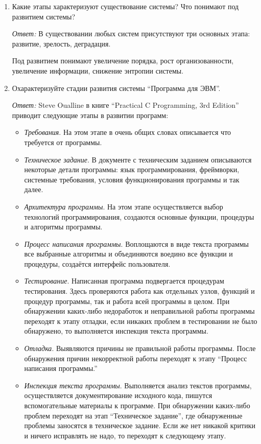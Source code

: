 \documentclass[10pt]{article}
\begin{document}
\begin{enumerate}
\item{Какие этапы характеризуют существование системы? Что понимают под развитием системы?}

  \emph{Ответ:} В существовании любых систем присутствуют три основных этапа: развитие, зрелость, деградация.

  Под развитием понимают увеличение порядка, рост организованности, увеличение информации, снижение энтропии системы.

\item{Охарактеризуйте стадии развития системы ``Программа для ЭВМ''.}

  \emph{Ответ:} Steve Oualline в книге ``Practical C Programming, 3rd Edition'' приводит следующие этапы в развитии программ:

  \begin{itemize}
  \item{\emph{Требования}. На этом этапе в очень общих словах описывается что требуется от программы.}
  \item{\emph{Техническое задание}. В документе с техническим заданием описываются некоторые детали программы: язык программирования, фреймворки, системные требования, условия функционирования программы и так далее.}
  \item{\emph{Архитектура программы}. На этом этапе осуществляется выбор технологий программирования, создаются основные функции, процедуры и алгоритмы программы.}
  \item{\emph{Процесс написания программы}. Воплощаются в виде текста программы все выбранные алгоритмы и объединяются воедино все функции и процедуры, создаётся интерфейс пользователя.}
  \item{\emph{Тестирование}. Написанная программа подвергается процедурам тестирования. Здесь проверяются работа как отдельных узлов, функций и процедур программы, так и работа всей программы в целом. При обнаружении каких-либо недоработок и неправильной работы программы переходят к этапу отладки, если никаких проблем в тестировании не было обнаружено, то выполняется инспекция текста программы.}
  \item{\emph{Отладка}. Выявляются причины не правильной работы программы. После обнаружения причин некорректной работы переходят к этапу ``Процесс написания программы.''}
  \item{\emph{Инспекция текста программы}. Выполняется анализ текстов программы, осуществляется документирование исходного кода, пишутся вспомогательные материалы к программе. При обнаружении каких-либо проблем переходят на этап ``Техническое задание'', где обнаруженные проблемы заносятся в техническое задание. Если же нет никакой критики и ничего исправлять не надо, то переходят к следующему этапу.}

\end{itemize}
\end{enumerate}
\end{document}
